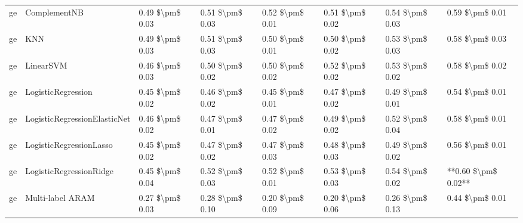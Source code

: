 \begin{tabular}{llllllll}
      ge &                    ComplementNB & 0.49 \$\textbackslash pm\$ 0.03 &           0.51 \$\textbackslash pm\$ 0.03 &       0.52 \$\textbackslash pm\$ 0.01 &        0.51 \$\textbackslash pm\$ 0.02 &                         0.54 \$\textbackslash pm\$ 0.03 &     0.59 \$\textbackslash pm\$ 0.01 \\
      ge &                             KNN & 0.49 \$\textbackslash pm\$ 0.03 &           0.51 \$\textbackslash pm\$ 0.03 &       0.50 \$\textbackslash pm\$ 0.01 &        0.50 \$\textbackslash pm\$ 0.02 &                         0.53 \$\textbackslash pm\$ 0.03 &     0.58 \$\textbackslash pm\$ 0.03 \\
      ge &                       LinearSVM & 0.46 \$\textbackslash pm\$ 0.03 &           0.50 \$\textbackslash pm\$ 0.02 &       0.50 \$\textbackslash pm\$ 0.02 &        0.52 \$\textbackslash pm\$ 0.02 &                         0.53 \$\textbackslash pm\$ 0.02 &     0.58 \$\textbackslash pm\$ 0.02 \\
      ge &              LogisticRegression & 0.45 \$\textbackslash pm\$ 0.02 &           0.46 \$\textbackslash pm\$ 0.02 &       0.45 \$\textbackslash pm\$ 0.01 &        0.47 \$\textbackslash pm\$ 0.02 &                         0.49 \$\textbackslash pm\$ 0.01 &     0.54 \$\textbackslash pm\$ 0.01 \\
      ge &    LogisticRegressionElasticNet & 0.46 \$\textbackslash pm\$ 0.02 &           0.47 \$\textbackslash pm\$ 0.01 &       0.47 \$\textbackslash pm\$ 0.02 &        0.49 \$\textbackslash pm\$ 0.02 &                         0.52 \$\textbackslash pm\$ 0.04 &     0.58 \$\textbackslash pm\$ 0.01 \\
      ge &         LogisticRegressionLasso & 0.45 \$\textbackslash pm\$ 0.02 &           0.47 \$\textbackslash pm\$ 0.02 &       0.47 \$\textbackslash pm\$ 0.03 &        0.48 \$\textbackslash pm\$ 0.03 &                         0.49 \$\textbackslash pm\$ 0.02 &     0.56 \$\textbackslash pm\$ 0.01 \\
      ge &         LogisticRegressionRidge & 0.45 \$\textbackslash pm\$ 0.04 &           0.52 \$\textbackslash pm\$ 0.03 &       0.52 \$\textbackslash pm\$ 0.01 &        0.53 \$\textbackslash pm\$ 0.03 &                         0.54 \$\textbackslash pm\$ 0.02 & **0.60 \$\textbackslash pm\$ 0.02** \\
      ge &                Multi-label ARAM & 0.27 \$\textbackslash pm\$ 0.03 &           0.28 \$\textbackslash pm\$ 0.10 &       0.20 \$\textbackslash pm\$ 0.09 &        0.20 \$\textbackslash pm\$ 0.06 &                         0.26 \$\textbackslash pm\$ 0.13 &     0.44 \$\textbackslash pm\$ 0.01 \\

\end{tabular}
